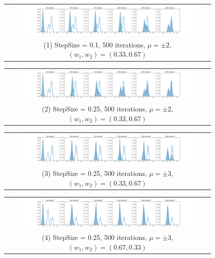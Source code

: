 
\newcommand{\toyfigwidth}{0.9\textwidth}
\begin{figure}[!htbp]
    \centering
    \begin{tabular}{@{}c@{}}
        \includegraphics[width=\toyfigwidth]{figs/toy-figure1_step0.1_mu2.0_w0.33_gaussian.png} \\
        \small (1) StepSize = 0.1, 500 iterations, $\mu = \pm 2$, $(w_1, w_2) = (0.33, 0.67)$
    \end{tabular}
    
    \begin{tabular}{@{}c@{}}
        \includegraphics[width=\toyfigwidth]{figs/toy-figure1.png} \\
        \small (2) StepSize = 0.25, 500 iterations, $\mu = \pm 2$, $(w_1, w_2) = (0.33, 0.67)$
    \end{tabular}
    
    \begin{tabular}{@{}c@{}}
        \includegraphics[width=\toyfigwidth]{figs/toy-figure1_step0.25_mu3.0_w0.33_gaussian.png} \\
        \small (3) StepSize = 0.25, 500 iterations, $\mu = \pm 3$, $(w_1, w_2) = (0.33, 0.67)$
    \end{tabular}
    
    \begin{tabular}{@{}c@{}}
        \includegraphics[width=\toyfigwidth]{figs/toy-figure1_step0.25_mu3.0_w0.67_gaussian.png} \\
        \small (4) StepSize = 0.25, 500 iterations, $\mu = \pm 3$, $(w_1, w_2) = (0.67, 0.33)$
    \end{tabular}
    

\end{figure}
